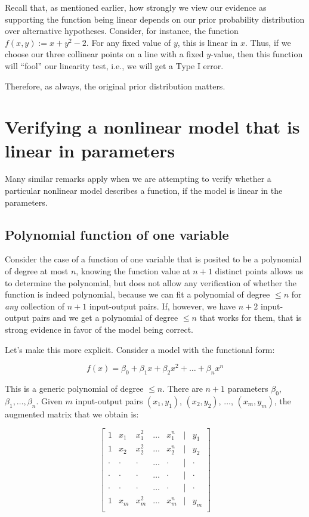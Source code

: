 \documentclass[10pt]{amsart}
\begin{document}
Recall that, as mentioned earlier, how strongly we view our evidence
as supporting the function being linear depends on our prior
probability distribution over alternative hypotheses. Consider, for
instance, the function $f(x,y) := x + y^2 - 2$. For any fixed value of
$y$, this is linear in $x$. Thus, if we choose our three collinear
points on a line with a fixed $y$-value, then this function will
``fool'' our linearity test, i.e., we will get a Type I error.

Therefore, as always, the original prior distribution matters.

\section{Verifying a nonlinear model that is linear in parameters}

Many similar remarks apply when we are attempting to verify whether a
particular nonlinear model describes a function, if the model is
linear in the parameters. 

\subsection{Polynomial function of one variable}

Consider the case of a function of one variable that is posited to be
a polynomial of degree at most $n$, knowing the function value at $n +
1$ distinct points allows us to determine the polynomial, but does not
allow any verification of whether the function is indeed polynomial,
because we can fit a polynomial of degree $\le n$ for {\em any}
collection of $n + 1$ input-output pairs. If, however, we have $n + 2$
input-output pairs and we get a polynomial of degree $\le n$ that
works for them, that is strong evidence in favor of the model being
correct.

Let's make this more explicit. Consider a model with the functional
form:

$$f(x) = \beta_0 + \beta_1x + \beta_2x^2 + \dots + \beta_nx^n$$

This is a generic polynomial of degree $\le n$. There are $n + 1$
parameters $\beta_0$, $\beta_1, \dots,\beta_n$. Given $m$ input-output pairs
$(x_1,y_1)$, $(x_2,y_2)$, $\dots$, $(x_m,y_m)$, the augmented matrix
that we obtain is:
 
$$\left[\begin{matrix} 1 & x_1 & x_1^2 & \dots & x_1^n & \mid & y_1 \\ 1 & x_2 & x_2^2 & \dots & x_2^n & \mid & y_2 \\ \cdot & \cdot & \cdot & \dots & \cdot & \mid & \cdot \\ \cdot & \cdot & \cdot & \dots & \cdot & \mid & \cdot \\ \cdot & \cdot & \cdot & \dots & \cdot & \mid & \cdot \\  1 & x_m & x_m^2 & \dots & x_m^n & \mid & y_m \\\end{matrix}\right]$$
\end{document}
